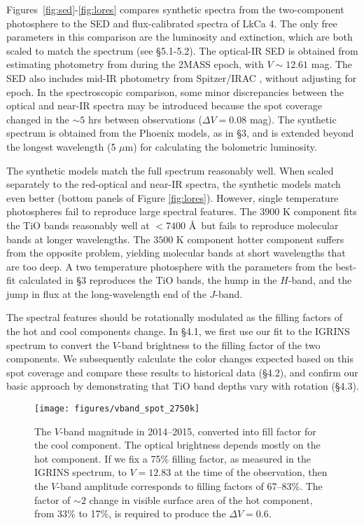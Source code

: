 \documentclass[twocolumn]{emulateapj}%
\begin{document}
Figures~\ref{fig:sed}-\ref{fig:lores} compares synthetic spectra from the two-component photosphere to the SED and flux-calibrated spectra of LkCa 4.  The only free parameters in this comparison are the luminosity and extinction, which are both scaled to match the spectrum (see \S 5.1-5.2).  The optical-IR SED is obtained from estimating photometry from \citet{grankin08} during the 2MASS epoch, with $V\sim12.61$ mag.  The SED also includes mid-IR photometry from Spitzer/IRAC \citep{hartmann05}, without adjusting for epoch.  In the spectroscopic comparison, some minor discrepancies between the optical and near-IR spectra may be introduced because the spot coverage changed in the $\sim 5$ hrs between observations ($\Delta V=0.08$ mag).  The synthetic spectrum is obtained from the Phoenix models, as in \S 3, and is extended beyond the longest wavelength (5 $\mu$m) for calculating the bolometric luminosity.

The synthetic models match the full spectrum reasonably well.  When scaled separately to the red-optical and near-IR spectra, the synthetic models match even better (bottom panels of Figure \ref{fig:lores}).  However, single temperature photospheres fail to reproduce large spectral features.   The $3900$ K component fits the TiO bands reasonably well at $<7400$ \AA\ but fails to reproduce molecular bands at longer wavelengths.  The $3500$ K component hotter component suffers from the opposite problem, yielding molecular bands at short wavelengths that are too deep.  A two temperature photosphere with the parameters from the best-fit calculated in \S 3 reproduces the TiO bands, the hump in the $H$-band, and the jump in flux at the long-wavelength end of the $J$-band.

The spectral features should be rotationally modulated as the filling factors of the hot and cool components change.    In \S 4.1, we first use our fit to the IGRINS spectrum to convert the $V$-band brightness to the filling factor of the two components.  We subsequently calculate the color changes expected based on this spot coverage and compare these results to historical data (\S 4.2), and confirm our basic approach by demonstrating that TiO band depths vary with rotation (\S 4.3).



\begin{figure*}
 \centering
 \texttt{[image: figures/vband\_spot\_2750k]}
\caption{The $V$-band magnitude in 2014--2015, converted into fill factor for the cool component.  The optical brightness depends mostly on the hot component.  If we fix a 75\% filling factor, as measured in the IGRINS spectrum, to $V=12.83$ at the time of the observation, then the $V$-band amplitude  corresponds to filling factors of 67--83\%.  The factor of $\sim 2$ change in visible surface area of the hot component, from 33\% to 17\%, is required to produce the $\Delta V=0.6$. }
\label{fig:vband_spot}
\end{figure*}
\end{document}
